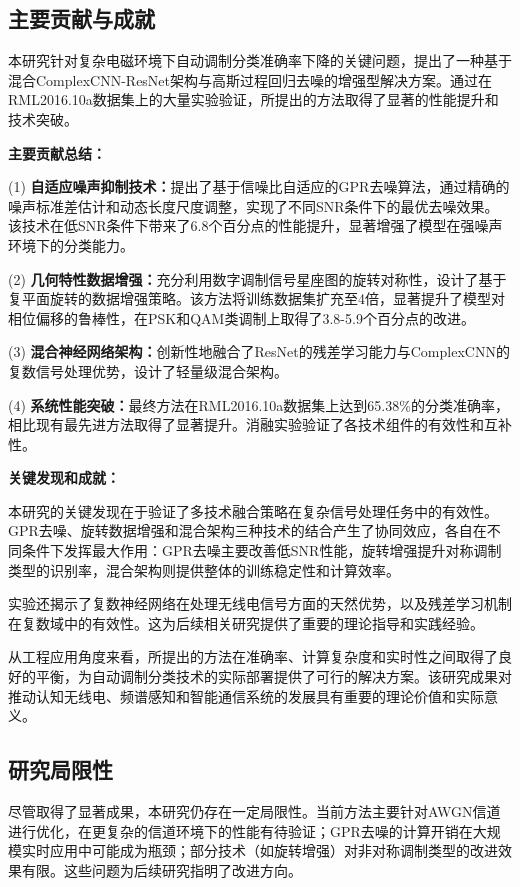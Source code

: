 \documentclass[conference]{IEEEtran}
\begin{document}
\subsection{主要贡献与成就}

本研究针对复杂电磁环境下自动调制分类准确率下降的关键问题，提出了一种基于混合ComplexCNN-ResNet架构与高斯过程回归去噪的增强型解决方案。通过在RML2016.10a数据集上的大量实验验证，所提出的方法取得了显著的性能提升和技术突破。

\textbf{主要贡献总结：}

(1) \textbf{自适应噪声抑制技术：}提出了基于信噪比自适应的GPR去噪算法，通过精确的噪声标准差估计和动态长度尺度调整，实现了不同SNR条件下的最优去噪效果。该技术在低SNR条件下带来了6.8个百分点的性能提升，显著增强了模型在强噪声环境下的分类能力。

(2) \textbf{几何特性数据增强：}充分利用数字调制信号星座图的旋转对称性，设计了基于复平面旋转的数据增强策略。该方法将训练数据集扩充至4倍，显著提升了模型对相位偏移的鲁棒性，在PSK和QAM类调制上取得了3.8-5.9个百分点的改进。

(3) \textbf{混合神经网络架构：}创新性地融合了ResNet的残差学习能力与ComplexCNN的复数信号处理优势，设计了轻量级混合架构。

(4) \textbf{系统性能突破：}最终方法在RML2016.10a数据集上达到65.38\%的分类准确率，相比现有最先进方法取得了显著提升。消融实验验证了各技术组件的有效性和互补性。

\textbf{关键发现和成就：}

本研究的关键发现在于验证了多技术融合策略在复杂信号处理任务中的有效性。GPR去噪、旋转数据增强和混合架构三种技术的结合产生了协同效应，各自在不同条件下发挥最大作用：GPR去噪主要改善低SNR性能，旋转增强提升对称调制类型的识别率，混合架构则提供整体的训练稳定性和计算效率。

实验还揭示了复数神经网络在处理无线电信号方面的天然优势，以及残差学习机制在复数域中的有效性。这为后续相关研究提供了重要的理论指导和实践经验。

从工程应用角度来看，所提出的方法在准确率、计算复杂度和实时性之间取得了良好的平衡，为自动调制分类技术的实际部署提供了可行的解决方案。该研究成果对推动认知无线电、频谱感知和智能通信系统的发展具有重要的理论价值和实际意义。

\subsection{研究局限性}

尽管取得了显著成果，本研究仍存在一定局限性。当前方法主要针对AWGN信道进行优化，在更复杂的信道环境下的性能有待验证；GPR去噪的计算开销在大规模实时应用中可能成为瓶颈；部分技术（如旋转增强）对非对称调制类型的改进效果有限。这些问题为后续研究指明了改进方向。
\end{document}
